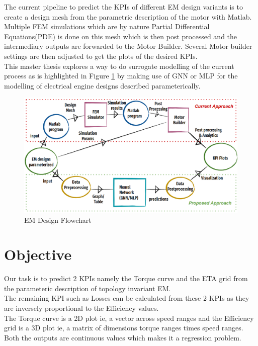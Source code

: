\documentclass{report} %
\begin{document}
The current pipeline to predict the \ac{KPI}s of different \ac{EM} design variants is to create a design mesh from the parametric description of the motor with Matlab.
Multiple \ac{FEM} simulations which are by nature Partial Differential Equations(PDE) is done on this mesh which is then post processed and the intermediary outputs are forwarded to the Motor Builder.
Several Motor builder settings are then adjusted to get the plots of the desired \ac{KPI}s.\\
This master thesis explores a way to do surrogate modelling of the current process as is highlighted in Figure \ref{fig:EM Design Flowchart} by making use of \ac{GNN} or \ac{MLP} for the modelling of electrical engine designs described parameterically. \\
\begin{figure}[H]
    \centering
    \includegraphics[width=1\textwidth]{./ReportImages/EM_design_flowchart_v2.png} 
    \caption{EM Design Flowchart}
    \label{fig:EM Design Flowchart}
\end{figure}


\section{Objective}\label{sec:Objective}
Our task is to predict 2 KPIs namely the Torque curve and the ETA grid from the parameteric description of topology invariant \ac{EM}. \\ 
The remaining \ac{KPI} such as Losses can be calculated from these 2 KPIs as they are inversely proportional to the Efficiency values.\\
The Torque curve is a 2D plot ie, a vector across speed ranges and the Efficiency grid is a 3D plot ie, a matrix of dimensions torque ranges times speed ranges. \\
Both the outputs are continuous values which makes it a regression problem. \\
\end{document}
